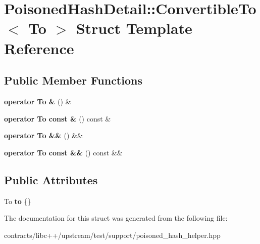 \hypertarget{struct_poisoned_hash_detail_1_1_convertible_to}{}\section{Poisoned\+Hash\+Detail\+:\+:Convertible\+To$<$ To $>$ Struct Template Reference}
\label{struct_poisoned_hash_detail_1_1_convertible_to}
\subsection*{Public Member Functions}
\begin{DoxyCompactItemize}
\item 
\mbox{\label{struct_poisoned_hash_detail_1_1_convertible_to_a73b63f1be9a0086fc5f8bcaa8f7d6a36}} 
{\bfseries operator To \&} () \&
\item 
\mbox{\label{struct_poisoned_hash_detail_1_1_convertible_to_ad6bdb1155e54d451dbf080d75348567a}} 
{\bfseries operator To const \&} () const \&
\item 
\mbox{\label{struct_poisoned_hash_detail_1_1_convertible_to_a89a0f89f1aaa95180eb6f91e7b3bb91c}} 
{\bfseries operator To \&\&} () \&\&
\item 
\mbox{\label{struct_poisoned_hash_detail_1_1_convertible_to_ac1afed40227029b5caad3bd567a7317d}} 
{\bfseries operator To const \&\&} () const \&\&
\end{DoxyCompactItemize}
\subsection*{Public Attributes}
\begin{DoxyCompactItemize}
\item 
\mbox{\label{struct_poisoned_hash_detail_1_1_convertible_to_af83aa985c16e93880b9f81a0eae86a86}} 
To {\bfseries to} \{\}
\end{DoxyCompactItemize}


The documentation for this struct was generated from the following file\+:\begin{DoxyCompactItemize}
\item 
contracts/libc++/upstream/test/support/poisoned\+\_\+hash\+\_\+helper.\+hpp\end{DoxyCompactItemize}
